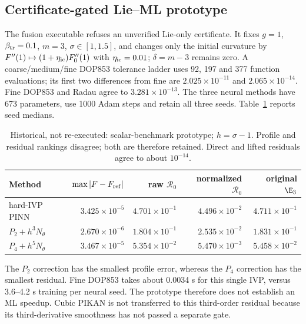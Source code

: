 \subsection{Certificate-gated Lie--ML prototype}
The fusion executable refuses an unverified Lie-only certificate. It fixes
$g=1$, $\beta_{\rm tr}=0.1$, $m=3$, $\sigma\in[1,1.5]$, and changes only
the initial curvature by
$F''(1)\mapsto(1+\eta_{\rm ic})F_0''(1)$ with $\eta_{\rm ic}=0.01$;
$\delta=m-3$ remains zero. A coarse/medium/fine DOP853 tolerance ladder uses
92, 197 and 377 function evaluations; its first two differences from fine are
$2.025\times10^{-11}$ and $2.065\times10^{-14}$. Fine DOP853 and Radau agree
to $3.281\times10^{-13}$.
The three neural methods have 673 parameters, use 1000 Adam steps and retain
all three seeds. Table~\ref{tab:fusion} reports seed medians.
\begin{table}[htbp]
\centering\small
\begin{tabular}{@{}lrrrr@{}}
\toprule
Method & $\max|F-F_{\rm ref}|$ & raw $\mathcal R_0$ & normalized
 $\mathcal R_0$ & original $\E_3$ \\
\midrule
hard-IVP PINN & $3.425\times10^{-5}$ & $4.701\times10^{-1}$ & $4.496\times10^{-2}$ & $4.711\times10^{-1}$ \\
$P_2+h^3N_\theta$ & $2.670\times10^{-6}$ & $1.804\times10^{-1}$ & $2.535\times10^{-2}$ & $1.831\times10^{-1}$ \\
$P_4+h^5N_\theta$ & $3.467\times10^{-5}$ & $5.354\times10^{-2}$ & $5.470\times10^{-3}$ & $5.458\times10^{-2}$ \\
\bottomrule
\end{tabular}
\caption{Historical, not re-executed: scalar-benchmark prototype; $h=\sigma-1$. Profile and residual rankings disagree; both
are therefore retained. Direct and lifted residuals agree to about $10^{-14}$.}
\label{tab:fusion}
\end{table}

The $P_2$ correction has the smallest profile error, whereas the $P_4$
correction has the smallest residual. Fine DOP853 takes about 0.0034 s for this
single IVP, versus 3.6--4.2 s training per neural seed. The prototype therefore
does not establish an ML speedup. Cubic PIKAN is not transferred to this
third-order residual because its third-derivative smoothness has not passed a
separate gate.

